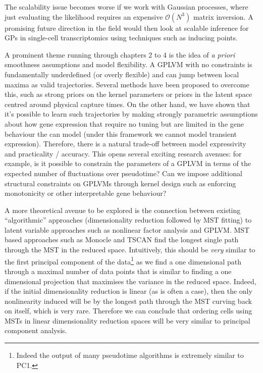 The scalability issue becomes worse if we work with Gaussian processes, where just evaluating the likelihood requires an expensive $\mathcal{O}(N^3)$ matrix inversion. A promising future direction in the field would then look at scalable inference for GPs in single-cell transcriptomics using techniques such as inducing points.

A prominent theme running through chapters 2 to 4   is the idea of \emph{a priori} smoothness assumptions and model flexibility. A GPLVM with no constraints is fundamentally underdefined (or overly flexible) and can jump between local maxima as valid trajectories. Several methods have been proposed to overcome this, such as strong priors on the kernel parameters or priors in the latent space centred around physical capture times. On the other hand, we have shown that it's possible to learn such trajectories by making strongly parametric assumptions about how gene expression that require no tuning but are limited in the gene behaviour the can model (under this framework we cannot model transient expression). Therefore, there is a natural trade-off between model expressivity and practicality / accuracy. This opens several exciting research avenues: for example, is it possible to constrain the parameters of a GPLVM in terms of the expected number of fluctuations over pseudotime? Can we impose additional structural constraints on GPLVMs through kernel design such as enforcing monotonicity or other interpretable gene behaviour?

A more theoretical avenue to be explored is the connection between existing ``algorithmic'' approaches (dimensionality reduction followed by MST fitting) to latent variable approaches such as nonlinear factor analysis and GPLVM. MST based approaches such as Monocle and TSCAN find the longest single path through the MST in the reduced space. Intuitively, this should be \emph{very} similar to the first principal component of the data\footnote{
    Indeed the output of many pseudotime algorithms is extremely similar to PC1.
} as we find a one dimensional path through a maximal number of data points that is similar to finding a one dimensional projection that maximises the variance in the reduced space. Indeed, if the initial dimensionality reduction is linear (as is often a case), then the only nonlinearity induced will be by the longest path through the MST curving back on itself, which is very rare. Therefore we can conclude that ordering cells using MSTs in linear dimensionality reduction spaces will be very similar to principal component analysis.

